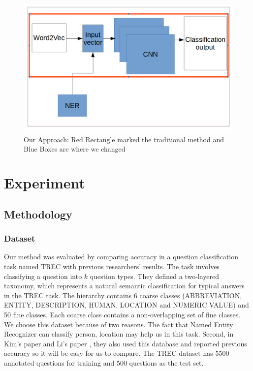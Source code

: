 \documentclass[10pt,twocolumn,letterpaper]{article}
\begin{document}
\begin{figure}
  \includegraphics[width=\linewidth]{process.png}
  \caption{Our Approach: Red Rectangle marked the traditional method and Blue Boxes are where we changed}
  \label{process}
\end{figure}




\section{Experiment}
\subsection{Methodology}

\subsubsection{Dataset}
Our method was evaluated by comparing accuracy in a question classification task named TREC \cite{li2006learning} with previous researchers' results. The task involves classifying a question into $k$ question types. They defined a two-layered taxonomy, which represents a  natural semantic classification for typical answers in the TREC task. The hierarchy contains 6 coarse classes (ABBREVIATION, ENTITY, DESCRIPTION, HUMAN, LOCATION and NUMERIC VALUE) and 50 fine classes. Each coarse  class contains a non-overlapping set of fine classes. We choose this dataset because of two reasons. The fact that Named Entity Recognizer can classify person, location may help us in this task. Second, in Kim's paper \cite{kim2014convolutional} and Li's paper \cite{li2006learning}, they also used this database and reported previous accuracy so it will be easy for us to compare. The TREC dataset has 5500 annotated questions for training and 500 questions as the test set.
\end{document}
